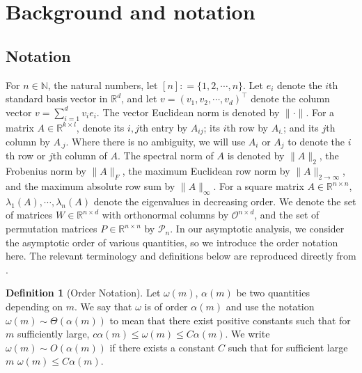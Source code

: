 \documentclass[12pt]{article}
\newcommand{\RR}{\mathbb{R}}
\newcommand{\NN}{\mathbb{N}}
\theoremstyle{definition}
\newtheorem{definition}{Definition}
\newcommand{\R}{\mathbb{R}}
\begin{document}





\section{Background and notation}\label{sec:Background_and_notation}

\subsection{Notation}

For $n \in \NN$, the natural numbers, let $[n] : = \{1,2,\cdots,n\}$. Let $e_i$ denote the $i$th standard basis vector in $\mathbb{R}^d$, and let $v=\left(v_1, v_2, \cdots, v_d\right)^\top$ denote the column vector $v=\sum_{i=1}^d v_i e_i$.  The vector Euclidean norm is denoted by $\|\cdot\|$. For a matrix $A \in \R^{k \times l}$, denote its $i, j$th entry by $A_{ij}$; its $i$th row by $A_{i.}$; and its $j$th column by $A_{.j}$. Where there is no ambiguity, we will use $A_i$ or $A_j$ to denote the $i$th row or $j$th column of $A$. 
The spectral norm of $A$ is denoted by $\|A\|_2$, the Frobenius norm by $\|A\|_F$, the maximum Euclidean row norm by $\|A\|_{2 \to \infty}$, and the maximum absolute row sum by $\|A\|_{\infty}$. For a square matrix $A \in \R^{n \times n}$, $\lambda_1(A), \cdots, \lambda_n(A)$ denote the eigenvalues in decreasing order. We denote the set of matrices $W\in \RR^{n\times d}$ with orthonormal columns by $\mathcal{O}^{n\times d}$, and the set of permutation matrices $P\in \RR^{n\times n}$ by $\mathcal{P}_n$.
In our asymptotic analysis, we consider the asymptotic order of various quantities, so we introduce the order notation here. The relevant terminology and definitions below are reproduced directly from \cite{chen2024euclidean}.
\begin{definition}[Order Notation]
Let $\omega(m)$, $\alpha(m)$ be two quantities depending on $m$. We say that $\omega$ is of order $\alpha(m)$ and use the notation $\omega(m) \sim \Theta(\alpha(m))$ to mean that there exist positive constants such that for $m$ sufficiently large, $c\alpha(m)\leq \omega(m) \leq C \alpha(m)$. We write $\omega(m) \sim O(\alpha(m))$ if there exists a constant $C$ such that for sufficient large $m$ $\omega(m) \leq C \alpha(m)$.
\end{definition}
\end{document}
